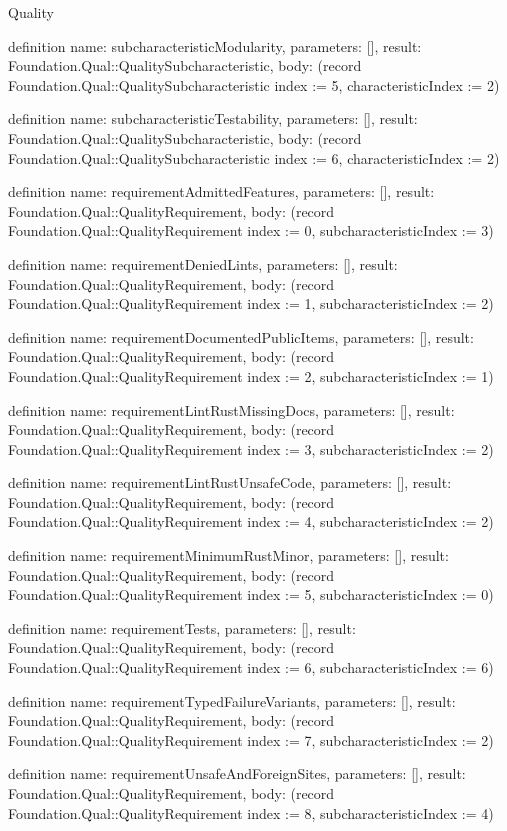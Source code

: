 \begin{lexlean}{Quality}
\begin{semanticmodule}
definition{
  name: subcharacteristicModularity,
  parameters: [],
  result: Foundation.Qual::QualitySubcharacteristic,
  body: (record Foundation.Qual::QualitySubcharacteristic {index := 5, characteristicIndex := 2})
}

definition{
  name: subcharacteristicTestability,
  parameters: [],
  result: Foundation.Qual::QualitySubcharacteristic,
  body: (record Foundation.Qual::QualitySubcharacteristic {index := 6, characteristicIndex := 2})
}

definition{
  name: requirementAdmittedFeatures,
  parameters: [],
  result: Foundation.Qual::QualityRequirement,
  body: (record Foundation.Qual::QualityRequirement {index := 0, subcharacteristicIndex := 3})
}

definition{
  name: requirementDeniedLints,
  parameters: [],
  result: Foundation.Qual::QualityRequirement,
  body: (record Foundation.Qual::QualityRequirement {index := 1, subcharacteristicIndex := 2})
}

definition{
  name: requirementDocumentedPublicItems,
  parameters: [],
  result: Foundation.Qual::QualityRequirement,
  body: (record Foundation.Qual::QualityRequirement {index := 2, subcharacteristicIndex := 1})
}

definition{
  name: requirementLintRustMissingDocs,
  parameters: [],
  result: Foundation.Qual::QualityRequirement,
  body: (record Foundation.Qual::QualityRequirement {index := 3, subcharacteristicIndex := 2})
}

definition{
  name: requirementLintRustUnsafeCode,
  parameters: [],
  result: Foundation.Qual::QualityRequirement,
  body: (record Foundation.Qual::QualityRequirement {index := 4, subcharacteristicIndex := 2})
}

definition{
  name: requirementMinimumRustMinor,
  parameters: [],
  result: Foundation.Qual::QualityRequirement,
  body: (record Foundation.Qual::QualityRequirement {index := 5, subcharacteristicIndex := 0})
}

definition{
  name: requirementTests,
  parameters: [],
  result: Foundation.Qual::QualityRequirement,
  body: (record Foundation.Qual::QualityRequirement {index := 6, subcharacteristicIndex := 6})
}

definition{
  name: requirementTypedFailureVariants,
  parameters: [],
  result: Foundation.Qual::QualityRequirement,
  body: (record Foundation.Qual::QualityRequirement {index := 7, subcharacteristicIndex := 2})
}

definition{
  name: requirementUnsafeAndForeignSites,
  parameters: [],
  result: Foundation.Qual::QualityRequirement,
  body: (record Foundation.Qual::QualityRequirement {index := 8, subcharacteristicIndex := 4})
}


\end{semanticmodule}
\end{lexlean}
